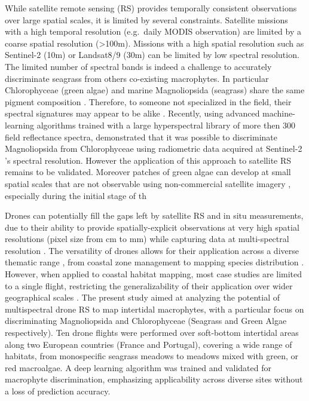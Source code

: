 \documentclass[
  number]{elsarticle}
\begin{document}
While satellite remote sensing (RS) provides temporally consistent
observations over large spatial scales, it is limited by several
constraints. Satellite missions with a high temporal resolution
(e.g.~daily MODIS observation) are limited by a coarse spatial
resolution (\textgreater100m). Missions with a high spatial resolution
such as Sentinel-2 (10m) or Landsat8/9 (30m) can be limited by low
spectral resolution. The limited number of spectral bands is indeed a
challenge to accurately discriminate seagrass from others co-existing
macrophytes. In particular Chlorophyceae (green algae) and marine
Magnoliopsida (seagrass) share the same pigment composition
\citetext{\citealp[ ]{ralph2002}; \citealp{Douay2022}}. Therefore, to
someone not specialized in the field, their spectral signatures may
appear to be alike \citetext{\citealp[
]{Davies2023}; \citealp{bannari2022}}. Recently, using advanced
machine-learning algorithms trained with a large hyperspectral library
of more then 300 field reflectance spectra, \citep{Davies2023}
demonstrated that it was possible to discriminate Magnoliopsida from
Chlorophyceae using radiometric data acquired at Sentinel-2 's spectral
resolution. However the application of this approach to satellite RS
remains to be validated. Moreover patches of green algae can develop at
small spatial scales that are not observable using non-commercial
satellite imagery \citep{tuya2013}, especially during the initial stage
of th

Drones can potentially fill the gaps left by satellite RS and in situ
measurements, due to their ability to provide spatially-explicit
observations at very high spatial resolutions (pixel size from cm to mm)
while capturing data at multi-spectral resolution \citetext{\citealp[
]{fairley2022drone}; \citealp{oh2017use}}. The versatility of drones
allows for their application across a diverse thematic range , from
coastal zone management \citetext{\citealp[ ]{adade2021}; \citealp[
]{casella2020}; \citealp{angnuureng2022}} to mapping species
distribution \citetext{\citealp[ ]{joyce2023}; \citealp[
]{tallam2023}; \citealp[ ]{Roca2022}; \citealp[
]{Roman2021}; \citealp{Brunier2022Topographic}}. However, when applied
to coastal habitat mapping, most case studies are limited to a single
flight, restricting the generalizability of their application over wider
geographical scales \citetext{\citealp[ ]{Roman2021}; \citealp[
]{collin2019improving}; \citealp[
]{rossiter2020uav}; \citealp{Brunier2022Topographic}}. The present study
aimed at analyzing the potential of multispectral drone RS to map
intertidal macrophytes, with a particular focus on discriminating
Magnoliopsida and Chlorophyceae (Seagrass and Green Algae respectively).
Ten drone flights were performed over soft-bottom intertidal areas along
two European countries (France and Portugal), covering a wide range of
habitats, from monospecific seagrass meadows to meadows mixed with
green, or red macroalgae. A deep learning algorithm was trained and
validated for macrophyte discrimination, emphasizing applicability
across diverse sites without a loss of prediction accuracy.
\end{document}
